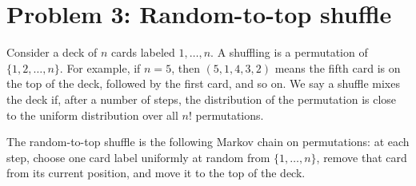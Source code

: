 \documentclass[answers,12pt,addpoints]{exam}
\begin{document}
\section*{Problem 3: Random-to-top shuffle}

Consider a deck of $n$ cards labeled $1,\dots,n$. A shuffling is a permutation of $\{1,2,\dots,n\}$. For example, if $n=5$, then $(5,1,4,3,2)$ means the fifth card is on the top of the deck, followed by the first card, and so on. We say a shuffle mixes the deck if, after a number of steps, the distribution of the permutation is close to the uniform distribution over all $n!$ permutations.

The random-to-top shuffle is the following Markov chain on permutations: at each step, choose one card label uniformly at random from $\{1,\dots,n\}$, remove that card from its current position, and move it to the top of the deck.
\end{document}

